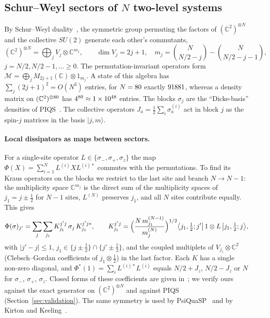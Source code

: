 \documentclass[11pt]{article}
\newcommand{\C}{\mathbb{C}}
\newcommand{\M}{\mathcal{M}}
\begin{document}
\subsection{Schur--Weyl sectors of \texorpdfstring{$N$}{N} two-level systems}\label{sec:schurweyl}

By Schur--Weyl duality~\cite{fulton1991}, the symmetric group permuting the factors of $(\C^2)^{\otimes N}$ and the
collective $SU(2)$ generate each other's commutants,
\begin{equation}\label{eq:sw}
  (\C^2)^{\otimes N}=\bigoplus_jV_j\otimes\C^{m_j},\qquad \dim V_j=2j+1,\quad
  m_j=\binom N{N/2-j}-\binom N{N/2-j-1},
\end{equation}
$j=N/2,N/2-1,\dots\ge0$. The permutation-invariant operators form $\M=\bigoplus_jM_{2j+1}(\C)\otimes1_{m_j}$. A state
of this algebra has $\sum_j(2j+1)^2=O(N^3)$ entries, for $N=80$ exactly $91881$, whereas a density matrix on
$(\C^2)^{\otimes\PMNmax}$ has $4^{80}\approx1\times10^{48}$ entries. The blocks $\sigma_j$ are the
``Dicke-basis'' densities of PIQS~\cite{shammah2018}. The collective operators $J_a=\frac12\sum_i\sigma_a^{(i)}$ act in
block $j$ as the spin-$j$ matrices in the basis $|j,m\rangle$.

\paragraph{Local dissipators as maps between sectors.} For a single-site operator $L\in\{\sigma_-,\sigma_+,\sigma_z\}$
the map $\Phi(X)=\sum_{i=1}^NL^{(i)}XL^{(i)*}$ commutes with the permutations. To find its Kraus operators on the blocks
we restrict to the last site and branch $N\to N-1$: the multiplicity space $\C^{m_j}$ is the direct sum of the
multiplicity spaces of $j_1=j\pm\frac12$ for $N-1$ sites, $L^{(N)}$ preserves $j_1$, and all $N$ sites contribute
equally. This gives
\begin{equation}\label{eq:kraus}
  \Phi(\sigma)_{j'}=\sum_j\sum_{j_1}K^{j'j}_{j_1}\,\sigma_j\,K^{j'j*}_{j_1},\qquad
  K^{j'j}_{j_1}=\Bigl(\frac{N\,m^{(N-1)}_{j_1}}{m^{(N)}_j}\Bigr)^{1/2}
  \bigl\langle j_1,\tfrac12;j'\bigr|\,1\otimes L\,\bigl|j_1,\tfrac12;j\bigr\rangle ,
\end{equation}
with $|j'-j|\le1$, $j_1\in\{j\pm\frac12\}\cap\{j'\pm\frac12\}$, and the coupled multiplets of $V_{j_1}\otimes\C^2$
(Clebsch--Gordan coefficients of $j_1\otimes\frac12$) in the last factor. Each $K$ has a single non-zero diagonal, and
$\Phi^*(1)=\sum_iL^{(i)*}L^{(i)}$ equals $N/2+J_z$, $N/2-J_z$ or $N$ for $\sigma_-$, $\sigma_+$, $\sigma_z$. Closed
forms of these coefficients are given in~\cite{chase2008,baragiola2010,shammah2018}; we verify ours against the exact
generator on $(\C^2)^{\otimes N}$ and against PIQS (Section~\ref{sec:validation}). The same symmetry is used by
PsiQuaSP~\cite{gegg2017} and by Kirton and Keeling~\cite{kirton2017}.
\end{document}
